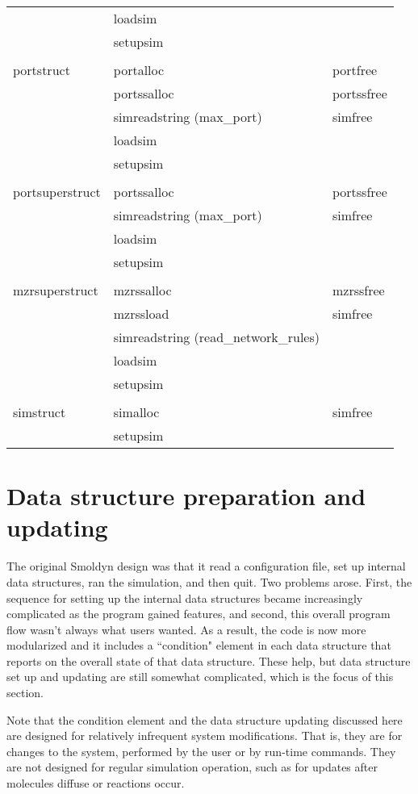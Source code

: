 \documentclass {book}
\begin{document}
\begin{ttfamily}
\begin{longtable}[c]{lll}
&loadsim\\
&setupsim\\
\\
portstruct&portalloc&portfree\\
&portssalloc&portssfree\\
&simreadstring (max\_port)&simfree\\
&loadsim\\
&setupsim\\
\\
portsuperstruct&portssalloc&portssfree\\
&simreadstring (max\_port)&simfree\\
&loadsim\\
&setupsim\\
\\
mzrsuperstruct&mzrssalloc&mzrssfree\\
&mzrssload&simfree\\
&simreadstring (read\_network\_rules)\\
&loadsim\\
&setupsim\\
\\
simstruct&simalloc&simfree\\
&setupsim\\
\end{longtable}
\end{ttfamily}

\section{Data structure preparation and updating}

The original Smoldyn design was that it read a configuration file, set up internal data structures, ran the simulation, and then quit. Two problems arose. First, the sequence for setting up the internal data structures became increasingly complicated as the program gained features, and second, this overall program flow wasn't always what users wanted. As a result, the code is now more modularized and it includes a ``condition" element in each data structure that reports on the overall state of that data structure. These help, but data structure set up and updating are still somewhat complicated, which is the focus of this section.

Note that the condition element and the data structure updating discussed here are designed for relatively infrequent system modifications. That is, they are for changes to the system, performed by the user or by run-time commands. They are not designed for regular simulation operation, such as for updates after molecules diffuse or reactions occur.
\end{document}
